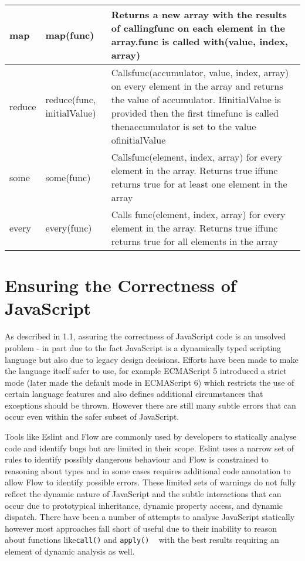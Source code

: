 \documentclass[]{final_report}
\begin{document}
{\begin{landscape}
\begin{table}[h]
{\begin{tabular}{|l|l|l|}
map &map(func) & Returns a new array with the results of callingfunc on each element in the array.func is called with(value, index, array) \\ \hline
reduce &reduce(func, initialValue) & Callsfunc(accumulator, value, index, array) on every element in the array and returns the value of accumulator. IfinitialValue is provided then the first timefunc is called thenaccumulator is set to the value ofinitialValue \\ \hline
some &some(func) & Callsfunc(element, index, array) for every element in the array. Returns true iffunc returns true for at least one element in the array \\ \hline
every &every(func) & Calls func(element, index, array) for every element in the array. Returns true iffunc returns true for all elements in the array \\ \hline
\end{tabular}
}
\end{table}
\end{landscape}
    \clearpage%
}


\section{Ensuring the Correctness of JavaScript}
As described in 1.1, assuring the correctness of JavaScript code is an unsolved problem - in part due to the fact JavaScript is a dynamically typed scripting language but also due to legacy design decisions. Efforts have been made to make the language itself safer to use, for example ECMAScript 5 introduced a strict mode (later made the default mode in ECMAScript 6) which restricts the use of certain language features and also defines additional circumstances that exceptions should be thrown. However there are still many subtle errors that can occur even within the safer subset of JavaScript.

Tools like Eslint and Flow are commonly used by developers to statically analyse code and identify bugs but are limited in their scope. Eslint uses a narrow set of rules to identify possibly dangerous behaviour and Flow is constrained to reasoning about types and in some cases requires additional code annotation to allow Flow to identify possible errors. These limited sets of warnings do not fully reflect the dynamic nature of JavaScript and the subtle interactions that can occur due to prototypical inheritance, dynamic property access, and dynamic dispatch. There have been a number of attempts to analyse JavaScript statically however most approaches fall short of useful due to their inability to reason about functions like\lstinline{call()} and \lstinline{apply()} ~\cite{sridharan2012correlation} with the best results requiring an element of dynamic analysis as well. ~\cite{logozzo2010rata} ~\cite{wei2013practical}
\end{document}
